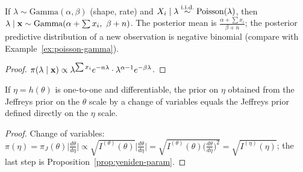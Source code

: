 \documentclass[main.tex]{subfiles}
\begin{document}
\begin{theorem}\label{thm:gamma-poisson}
If $\lambda\sim\text{Gamma}(\alpha,\beta)$ (shape, rate) and $X_i\mid\lambda\overset{\text{i.i.d.}}{\sim}\text{Poisson}(\lambda)$, then $\lambda\mid\x\sim\text{Gamma}(\alpha+\sum x_i,\ \beta+n)$. The posterior mean is $\frac{\alpha+\sum x_i}{\beta+n}$; the posterior predictive distribution of a new observation is negative binomial (compare with Example~\ref{ex:poisson-gamma}).
\end{theorem}
\begin{proof}
$\pi(\lambda\mid\mathbf{x})\propto\lambda^{\sum x_i}e^{-n\lambda}\cdot\lambda^{\alpha-1}e^{-\beta\lambda}$.
\end{proof}

\begin{theorem}\label{thm:jeffreys}
If $\eta=h(\theta)$ is one-to-one and differentiable, the prior on $\eta$ obtained from the Jeffreys prior on the $\theta$ scale by a change of variables equals the Jeffreys prior defined directly on the $\eta$ scale.
\end{theorem}
\begin{proof}
Change of variables: $\pi(\eta)=\pi_J(\theta)\big|\frac{d\theta}{d\eta}\big|\propto\sqrt{I^{(\theta)}(\theta)}\big|\frac{d\theta}{d\eta}\big|=\sqrt{I^{(\theta)}(\theta)\big(\frac{d\theta}{d\eta}\big)^2}=\sqrt{I^{(\eta)}(\eta)}$; the last step is Proposition~\ref{prop:yeniden-param}.
\end{proof}
\end{document}
